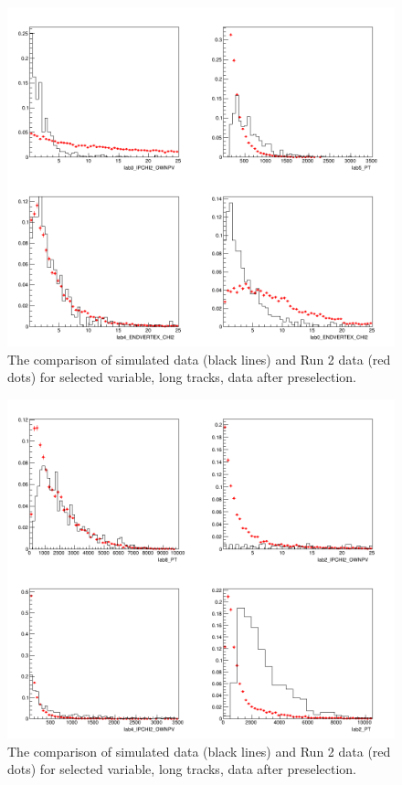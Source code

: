 \begin{figure}[ht]
\includegraphics[width=11.5cm]{figs/MC_Data_Comp/LL0_0.png}
\centering
\caption{The comparison of simulated data (black lines) and Run 2 data (red dots) for selected variable, long tracks, data after preselection.}
\label{fig:MC_Data_Comp_LL0_0}
\end{figure}


\begin{figure}[hb]
\includegraphics[width=11.5cm]{figs/MC_Data_Comp/LL0_1.png}
\centering
\caption{The comparison of simulated data (black lines) and Run 2 data (red dots) for selected variable, long tracks, data after preselection.}
\label{fig:MC_Data_Comp_LL0_1}
\end{figure}


